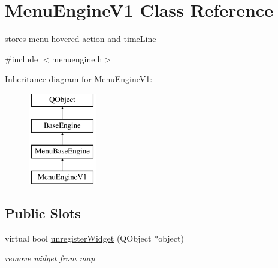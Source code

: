 \hypertarget{class_menu_engine_v1}{}\section{Menu\+Engine\+V1 Class Reference}
\label{class_menu_engine_v1}


stores menu hovered action and time\+Line  




{\ttfamily \#include $<$menuengine.\+h$>$}

Inheritance diagram for Menu\+Engine\+V1\+:\begin{figure}[H]
\begin{center}
\leavevmode
\includegraphics[height=4.000000cm]{class_menu_engine_v1}
\end{center}
\end{figure}
\subsection*{Public Slots}
\begin{DoxyCompactItemize}
\item 
\mbox{\label{class_menu_engine_v1_a8a26923ed56d29cb2efb8d6bce56f725}} 
virtual bool \hyperlink{class_menu_engine_v1_a8a26923ed56d29cb2efb8d6bce56f725}{unregister\+Widget} (Q\+Object $\ast$object)
\begin{DoxyCompactList}\small\item\em remove widget from map \end{DoxyCompactList}\end{DoxyCompactItemize}
